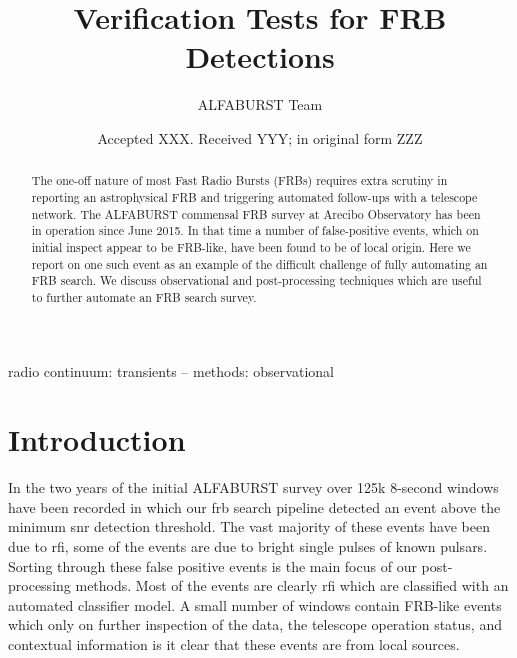 \documentclass[a4paper,fleqn,usenatbib]{mnras}
\title[Verification Tests for FRB Detections]{Verification Tests for FRB
Detections}
\author[ALFABURST Team]{
ALFABURST Team
}
\date{Accepted XXX. Received YYY; in original form ZZZ}
\begin{document}
\label{firstpage}
\pagerange{\pageref{firstpage}--\pageref{lastpage}}
\maketitle

\begin{abstract}
The one-off nature of most Fast Radio Bursts (FRBs) requires extra scrutiny in
reporting an astrophysical FRB and triggering automated follow-ups with a
telescope network.  The ALFABURST commensal FRB survey at Arecibo Observatory
has been in operation since June 2015. In that time a number of false-positive
events, which on initial inspect appear to be FRB-like, have been found to be of
local origin. Here we report on one such event as an example of the difficult
challenge of fully automating an FRB search. We discuss observational and
post-processing techniques which are useful to further automate an FRB search
survey.
\end{abstract}

\begin{keywords}
radio continuum: transients -- methods: observational
\end{keywords}


\section{Introduction}
\label{sec:intro}

In the two years of the initial ALFABURST survey\citep{2017ApJS..228...21C} over
125k 8-second windows have been recorded in which our \gls{frb} search pipeline
detected an event above the minimum \gls{snr} detection threshold. The vast
majority of these events have been due to \gls{rfi}, some of the events are due
to bright single pulses of known pulsars. Sorting through these false positive
events is the main focus of our post-processing methods. Most of the events are
clearly \gls{rfi} which are classified with an automated classifier model. A
small number of windows contain FRB-like events which only on further inspection
of the data, the telescope operation status, and contextual information is it
clear that these events are from local sources.
\end{document}
